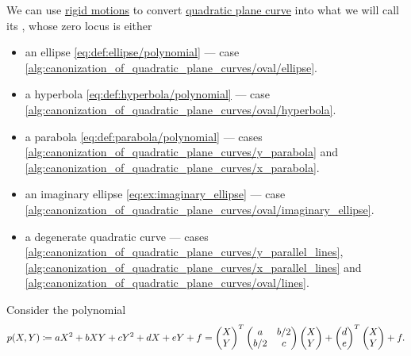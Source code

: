 \begin{algorithm}\label{alg:canonization_of_quadratic_plane_curves}
  We can use \hyperref[def:rigid_motion]{rigid motions} to convert \hyperref[def:quadratic_plane_curve]{quadratic plane curve} into what we will call its , whose zero locus is either
  \begin{itemize}
    \item an ellipse \eqref{eq:def:ellipse/polynomial} --- case \cref{alg:canonization_of_quadratic_plane_curves/oval/ellipse}.
    \item a hyperbola \eqref{eq:def:hyperbola/polynomial} --- case \cref{alg:canonization_of_quadratic_plane_curves/oval/hyperbola}.
    \item a parabola \eqref{eq:def:parabola/polynomial} --- cases \cref{alg:canonization_of_quadratic_plane_curves/y_parabola} and \cref{alg:canonization_of_quadratic_plane_curves/x_parabola}.
    \item an imaginary ellipse \eqref{eq:ex:imaginary_ellipse} --- case \cref{alg:canonization_of_quadratic_plane_curves/oval/imaginary_ellipse}.
    \item a degenerate quadratic curve --- cases \cref{alg:canonization_of_quadratic_plane_curves/y_parallel_lines},
  \cref{alg:canonization_of_quadratic_plane_curves/x_parallel_lines} and \cref{alg:canonization_of_quadratic_plane_curves/oval/lines}.
  \end{itemize}

  Consider the polynomial
  \begin{equation*}
    p(X, Y)
    \coloneqq
    a X^2 + b XY + c Y^2 + d X + e Y + f
    =
    \begin{pmatrix}
      X \\ Y
    \end{pmatrix}^T
    \begin{pmatrix}
      a          & \ifrac b 2 \\
      \ifrac b 2 & c
    \end{pmatrix}
    \begin{pmatrix}
      X \\ Y
    \end{pmatrix}
    +
    \begin{pmatrix}
      d \\ e
    \end{pmatrix}^T
    \begin{pmatrix}
      X \\ Y
    \end{pmatrix}
    +
    f.
  \end{equation*}


\end{algorithm}
